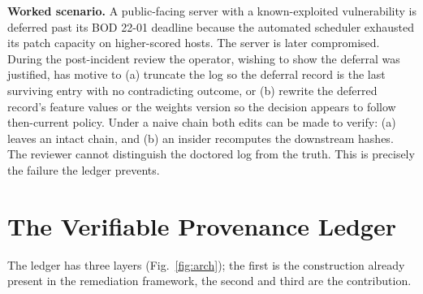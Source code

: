 \documentclass[journal]{IEEEtran}
\begin{document}
\textbf{Worked scenario.} A public-facing server with a known-exploited
vulnerability is deferred past its BOD 22-01 deadline because the automated
scheduler exhausted its patch capacity on higher-scored hosts. The server is
later compromised. During the post-incident review the operator, wishing to
show the deferral was justified, has motive to (a) truncate the log so the
deferral record is the last surviving entry with no contradicting outcome, or
(b) rewrite the deferred record's feature values or the weights version so
the decision appears to follow then-current policy. Under a naive chain both
edits can be made to verify: (a) leaves an intact chain, and (b) an insider
recomputes the downstream hashes. The reviewer cannot distinguish the
doctored log from the truth. This is precisely the failure the ledger
prevents.

\section{The Verifiable Provenance Ledger}
\label{sec:design}
The ledger has three layers (Fig.~\ref{fig:arch}); the first is the
construction already present in the remediation framework, the second and
third are the contribution.
\end{document}
